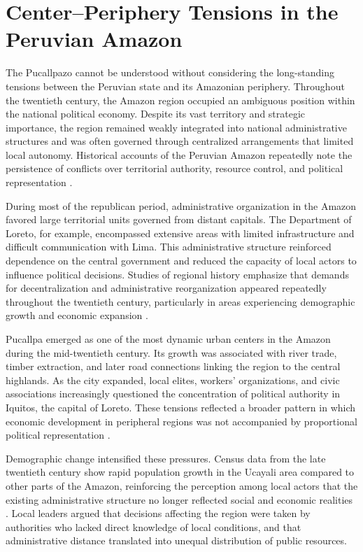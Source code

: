 \documentclass[12pt]{article}
\begin{document}
\section{Center--Periphery Tensions in the Peruvian Amazon}

The Pucallpazo cannot be understood without considering the long-standing
tensions between the Peruvian state and its Amazonian periphery.
Throughout the twentieth century, the Amazon region occupied an ambiguous
position within the national political economy. Despite its vast territory
and strategic importance, the region remained weakly integrated into
national administrative structures and was often governed through
centralized arrangements that limited local autonomy. Historical accounts
of the Peruvian Amazon repeatedly note the persistence of conflicts over
territorial authority, resource control, and political representation
\autocite{san_roman_perfiles_1994,dourojeanni_amazonia_1990}.

During most of the republican period, administrative organization in the
Amazon favored large territorial units governed from distant capitals.
The Department of Loreto, for example, encompassed extensive areas with
limited infrastructure and difficult communication with Lima. This
administrative structure reinforced dependence on the central government
and reduced the capacity of local actors to influence political decisions.
Studies of regional history emphasize that demands for decentralization
and administrative reorganization appeared repeatedly throughout the
twentieth century, particularly in areas experiencing demographic growth
and economic expansion \autocite{espinoza_soriano_loreto_2016}.

Pucallpa emerged as one of the most dynamic urban centers in the Amazon
during the mid-twentieth century. Its growth was associated with river
trade, timber extraction, and later road connections linking the region
to the central highlands. As the city expanded, local elites, workers'
organizations, and civic associations increasingly questioned the
concentration of political authority in Iquitos, the capital of Loreto.
These tensions reflected a broader pattern in which economic development
in peripheral regions was not accompanied by proportional political
representation \autocite{vivanco_pimentel_gran_1997}.

Demographic change intensified these pressures. Census data from the
late twentieth century show rapid population growth in the Ucayali area
compared to other parts of the Amazon, reinforcing the perception among
local actors that the existing administrative structure no longer
reflected social and economic realities
\autocite{inei_censos_1981,inei_resultados_2018}. Local leaders argued that decisions
affecting the region were taken by authorities who lacked direct
knowledge of local conditions, and that administrative distance
translated into unequal distribution of public resources.
\end{document}
